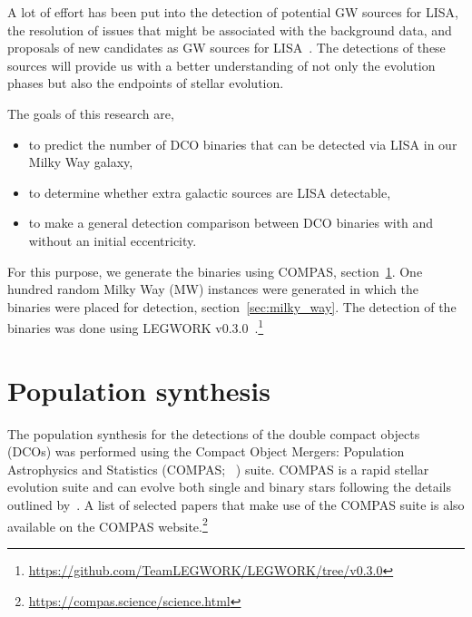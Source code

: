 \documentclass[12pt, journal, onecolumn]{IEEEtran}
\begin{document}

    A lot of effort has been put into the detection of potential GW sources for LISA, the resolution of issues that might be associated with the background data, and proposals of new candidates as GW sources for LISA~\cite[see, for example,][]{Lau2020, Sesana2009, Khakhaleva2020, Renzo2021, Fumagalli2022, wagg2021gravitational, Broekgaarden2021, Shao2021, Andrews2020, Belczynski2010, Guo2017, Babak2010, Blaut2010, Babak2008, Ruiter2010, Nelemans2001, Yu2010}.
    The detections of these sources will provide us with a better understanding of not only the evolution phases but also the endpoints of stellar evolution.

    The goals of this research are,
    \begin{itemize}%
        \item to predict the number of DCO binaries that can be detected via LISA in our Milky Way galaxy,
        \item to determine whether extra galactic sources are LISA detectable,
        \item to make a general detection comparison between DCO binaries with and without an initial eccentricity.
    \end{itemize}%

    For this purpose, we generate the binaries using COMPAS, section~\ref{sec:population_synthesis}.
    One hundred random Milky Way (MW) instances were generated in which the binaries were placed for detection, section~\ref{sec:milky_way}.
    The detection of the binaries was done using LEGWORK v0.3.0~\cite{wagg2021legwork}.\footnote{\url{https://github.com/TeamLEGWORK/LEGWORK/tree/v0.3.0}}


    \section{Population synthesis}
    \label{sec:population_synthesis}
    The population synthesis for the detections of the double compact objects (DCOs) was performed using the Compact Object Mergers: Population Astrophysics and Statistics (COMPAS; ~\cite{stevenson2017formation, Riley2022, Vigna2018}) suite.
    COMPAS is a rapid stellar evolution suite and can evolve both single and binary stars following the details outlined by~\cite{Hurley2000, Hurley2002}.
    A list of selected papers that make use of the COMPAS suite is also available on the COMPAS website.\footnote{\url{https://compas.science/science.html}}
\end{document}
